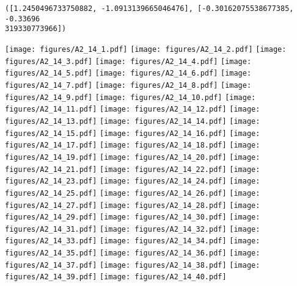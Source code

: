 \documentclass[12pt,a4paper]{article}
\begin{document}
\begin{lstlisting}
([1.2450496733750882, -1.0913139665046476], [-0.30162075538677385, -0.33696
319330773966])
\end{lstlisting}

\texttt{[image: figures/A2\_14\_1.pdf]}
\texttt{[image: figures/A2\_14\_2.pdf]}
\texttt{[image: figures/A2\_14\_3.pdf]}
\texttt{[image: figures/A2\_14\_4.pdf]}
\texttt{[image: figures/A2\_14\_5.pdf]}
\texttt{[image: figures/A2\_14\_6.pdf]}
\texttt{[image: figures/A2\_14\_7.pdf]}
\texttt{[image: figures/A2\_14\_8.pdf]}
\texttt{[image: figures/A2\_14\_9.pdf]}
\texttt{[image: figures/A2\_14\_10.pdf]}
\texttt{[image: figures/A2\_14\_11.pdf]}
\texttt{[image: figures/A2\_14\_12.pdf]}
\texttt{[image: figures/A2\_14\_13.pdf]}
\texttt{[image: figures/A2\_14\_14.pdf]}
\texttt{[image: figures/A2\_14\_15.pdf]}
\texttt{[image: figures/A2\_14\_16.pdf]}
\texttt{[image: figures/A2\_14\_17.pdf]}
\texttt{[image: figures/A2\_14\_18.pdf]}
\texttt{[image: figures/A2\_14\_19.pdf]}
\texttt{[image: figures/A2\_14\_20.pdf]}
\texttt{[image: figures/A2\_14\_21.pdf]}
\texttt{[image: figures/A2\_14\_22.pdf]}
\texttt{[image: figures/A2\_14\_23.pdf]}
\texttt{[image: figures/A2\_14\_24.pdf]}
\texttt{[image: figures/A2\_14\_25.pdf]}
\texttt{[image: figures/A2\_14\_26.pdf]}
\texttt{[image: figures/A2\_14\_27.pdf]}
\texttt{[image: figures/A2\_14\_28.pdf]}
\texttt{[image: figures/A2\_14\_29.pdf]}
\texttt{[image: figures/A2\_14\_30.pdf]}
\texttt{[image: figures/A2\_14\_31.pdf]}
\texttt{[image: figures/A2\_14\_32.pdf]}
\texttt{[image: figures/A2\_14\_33.pdf]}
\texttt{[image: figures/A2\_14\_34.pdf]}
\texttt{[image: figures/A2\_14\_35.pdf]}
\texttt{[image: figures/A2\_14\_36.pdf]}
\texttt{[image: figures/A2\_14\_37.pdf]}
\texttt{[image: figures/A2\_14\_38.pdf]}
\texttt{[image: figures/A2\_14\_39.pdf]}
\texttt{[image: figures/A2\_14\_40.pdf]}
\end{document}
